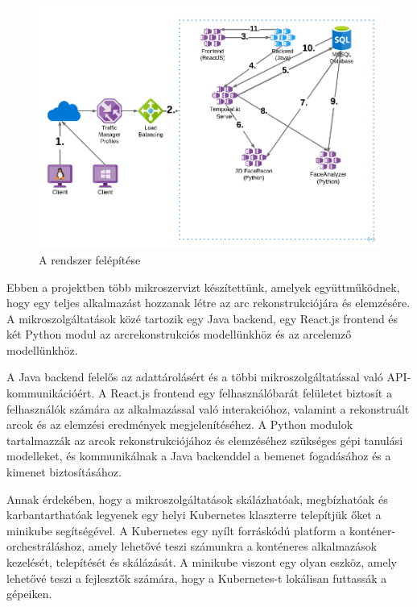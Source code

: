 \documentclass[12pt,a4]{article}
\begin{document}
            \begin{figure}[h]	
        		\centering
        		\includegraphics[width=1\linewidth]{sysplan}
        		\caption{ A rendszer felépítése}
        	    \label{fig:sysplan}
            \end{figure}

            Ebben a projektben több mikroszervizt készítettünk, amelyek együttműködnek, hogy egy teljes alkalmazást hozzanak létre az arc rekonstrukciójára és elemzésére. A mikroszolgáltatások közé tartozik egy Java backend, egy React.js frontend és két Python modul az arcrekonstrukciós modellünkhöz és az arcelemző modellünkhöz.

            A Java backend felelős az adattárolásért és a többi mikroszolgáltatással való API-kommunikációért. A React.js frontend egy felhasználóbarát felületet biztosít a felhasználók számára az alkalmazással való interakcióhoz, valamint a rekonstruált arcok és az elemzési eredmények megjelenítéséhez. A Python modulok tartalmazzák az arcok rekonstrukciójához és elemzéséhez szükséges gépi tanulási modelleket, és kommunikálnak a Java backenddel a bemenet fogadásához és a kimenet biztosításához.

            Annak érdekében, hogy a mikroszolgáltatások skálázhatóak, megbízhatóak és karbantarthatóak legyenek egy helyi Kubernetes klaszterre telepítjük őket a minikube segítségével. A Kubernetes egy nyílt forráskódú platform a konténer-orchestráláshoz, amely lehetővé teszi számunkra a konténeres alkalmazások kezelését, telepítését és skálázását. A minikube viszont egy olyan eszköz, amely lehetővé teszi a fejlesztők számára, hogy a Kubernetes-t lokálisan futtassák a gépeiken.
\end{document}
